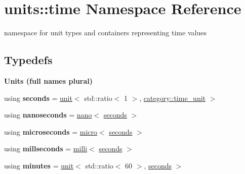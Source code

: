\hypertarget{namespaceunits_1_1time}{}\section{units\+:\+:time Namespace Reference}
\label{namespaceunits_1_1time}


namespace for unit types and containers representing time values  


\subsection*{Typedefs}
\begin{Indent}{\bf Units (full names plural)}\par
\begin{DoxyCompactItemize}
\item 
\hypertarget{namespaceunits_1_1time_a6018fcf32414d4d4cee1c15a6a849e09}{}using {\bfseries seconds} = \hyperlink{structunits_1_1unit}{unit}$<$ std\+::ratio$<$ 1 $>$, \hyperlink{namespaceunits_1_1category_a505444228cdf173b75aeed6932d7e1a9}{category\+::time\+\_\+unit} $>$\label{namespaceunits_1_1time_a6018fcf32414d4d4cee1c15a6a849e09}

\item 
\hypertarget{namespaceunits_1_1time_a0c07f94de03607f66ecbed08a58663d7}{}using {\bfseries nanoseconds} = \hyperlink{group___unit_manipulators_ga1c25c3c1d6c1f3aed3fd1ecf043110d5}{nano}$<$ \hyperlink{structunits_1_1unit}{seconds} $>$\label{namespaceunits_1_1time_a0c07f94de03607f66ecbed08a58663d7}

\item 
\hypertarget{namespaceunits_1_1time_abf5e5f17dbb6f8af4a84d1117bb19289}{}using {\bfseries microseconds} = \hyperlink{group___unit_manipulators_gaea53c906ec805110b93f02db4a961971}{micro}$<$ \hyperlink{structunits_1_1unit}{seconds} $>$\label{namespaceunits_1_1time_abf5e5f17dbb6f8af4a84d1117bb19289}

\item 
\hypertarget{namespaceunits_1_1time_ae3f717d4084ab51f0ecee2676de584f8}{}using {\bfseries millseconds} = \hyperlink{group___unit_manipulators_gaec9d1c320e180eb59f3cb3094d8079dd}{milli}$<$ \hyperlink{structunits_1_1unit}{seconds} $>$\label{namespaceunits_1_1time_ae3f717d4084ab51f0ecee2676de584f8}

\item 
\hypertarget{namespaceunits_1_1time_aff7d4a747446267eec44cdd6336298dd}{}using {\bfseries minutes} = \hyperlink{structunits_1_1unit}{unit}$<$ std\+::ratio$<$ 60 $>$, \hyperlink{structunits_1_1unit}{seconds} $>$\label{namespaceunits_1_1time_aff7d4a747446267eec44cdd6336298dd}


\end{DoxyCompactItemize}
\end{Indent}
